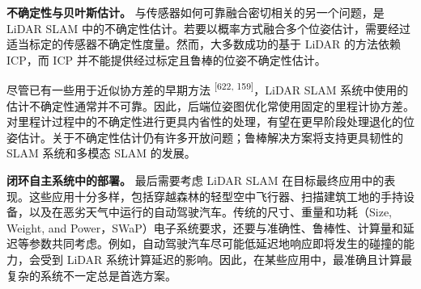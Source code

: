 \textbf{不确定性与贝叶斯估计。} 与传感器如何可靠融合密切相关的另一个问题，是 LiDAR SLAM 中的不确定性估计。若要以概率方式融合多个位姿估计，需要经过适当标定的传感器不确定性度量。然而，大多数成功的基于 LiDAR 的方法依赖 ICP，而 ICP 并不能提供经过标定且鲁棒的位姿不确定性估计。

尽管已有一些用于近似协方差的早期方法 \textsuperscript{[622, 159]}，LiDAR SLAM 系统中使用的估计不确定性通常并不可靠。因此，后端位姿图优化常使用固定的里程计协方差。对里程计过程中的不确定性进行更具内省性的处理，有望在更早阶段处理退化的位姿估计。关于不确定性估计仍有许多开放问题；鲁棒解决方案将支持更具韧性的 SLAM 系统和多模态 SLAM 的发展。

\textbf{闭环自主系统中的部署。} 最后需要考虑 LiDAR SLAM 在目标最终应用中的表现。这些应用十分多样，包括穿越森林的轻型空中飞行器、扫描建筑工地的手持设备，以及在恶劣天气中运行的自动驾驶汽车。传统的尺寸、重量和功耗（Size, Weight, and Power，SWaP）电子系统要求，还要与准确性、鲁棒性、计算量和延迟等参数共同考虑。例如，自动驾驶汽车尽可能低延迟地响应即将发生的碰撞的能力，会受到 LiDAR 系统计算延迟的影响。因此，在某些应用中，最准确且计算最复杂的系统不一定总是首选方案。
